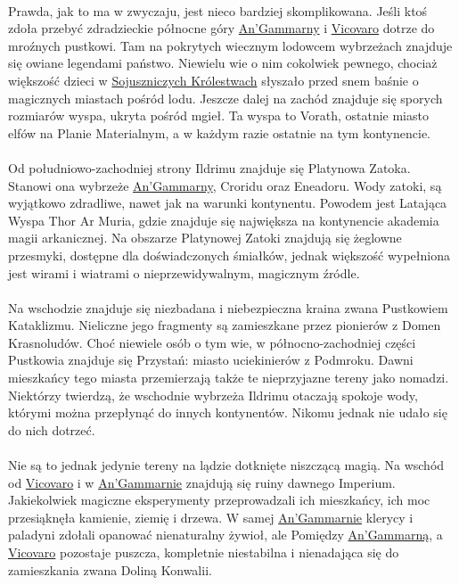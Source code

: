 \paragraph{}
Prawda, jak to ma w zwyczaju, jest nieco bardziej skomplikowana.
Jeśli ktoś zdoła przebyć zdradzieckie północne góry \hyperref[AnGammarna]{An’Gammarny} i \hyperref[Vicovaro]{Vicovaro} dotrze do mroźnych pustkowi.
Tam na pokrytych wiecznym lodowcem wybrzeżach znajduje się owiane legendami państwo.
Niewielu wie o nim cokolwiek pewnego, chociaż większość dzieci w \hyperref[SojuszniczeKrolestwa]{Sojuszniczych Królestwach} słyszało przed snem baśnie o magicznych miastach pośród lodu.
Jeszcze dalej na zachód znajduje się sporych rozmiarów wyspa, ukryta pośród mgieł.
Ta wyspa to Vorath, ostatnie miasto elfów na Planie Materialnym, a w każdym razie ostatnie na tym kontynencie.

\paragraph{}
Od południowo-zachodniej strony Ildrimu znajduje się Platynowa Zatoka.
Stanowi ona wybrzeże \hyperref[AnGammarna]{An’Gammarny}, Croridu oraz Eneadoru.
Wody zatoki, są wyjątkowo zdradliwe, nawet jak na warunki kontynentu.
Powodem jest Latająca Wyspa Thor Ar Muria, gdzie znajduje się największa na kontynencie akademia magii arkanicznej.
Na obszarze Platynowej Zatoki znajdują się żeglowne przesmyki, dostępne dla doświadczonych śmiałków, jednak większość wypełniona jest wirami i wiatrami o nieprzewidywalnym, magicznym źródle.

\paragraph{}
Na wschodzie znajduje się niezbadana i niebezpieczna kraina zwana Pustkowiem Kataklizmu.
Nieliczne jego fragmenty są zamieszkane przez pionierów z Domen Krasnoludów.
Choć niewiele osób o tym wie, w północno-zachodniej części Pustkowia znajduje się Przystań: miasto uciekinierów z Podmroku.
Dawni mieszkańcy tego miasta przemierzają także te nieprzyjazne tereny jako nomadzi.
Niektórzy twierdzą, że wschodnie wybrzeża Ildrimu otaczają spokoje wody, którymi można przepłynąć do innych kontynentów. Nikomu jednak nie udało się do nich dotrzeć.

\paragraph{}
Nie są to jednak jedynie tereny na lądzie dotknięte niszczącą magią.
Na wschód od \hyperref[Vicovaro]{Vicovaro} i w \hyperref[AnGammarna]{An’Gammarnie} znajdują się ruiny dawnego Imperium.
Jakiekolwiek magiczne eksperymenty przeprowadzali ich mieszkańcy, ich moc przesiąknęła kamienie, ziemię i drzewa.
W samej \hyperref[AnGammarna]{An’Gammarnie} klerycy i paladyni zdołali opanować nienaturalny żywioł, ale Pomiędzy \hyperref[AnGammarna]{An’Gammarną}, a \hyperref[Vicovaro]{Vicovaro} pozostaje puszcza, kompletnie niestabilna i nienadająca się do zamieszkania zwana Doliną Konwalii.


